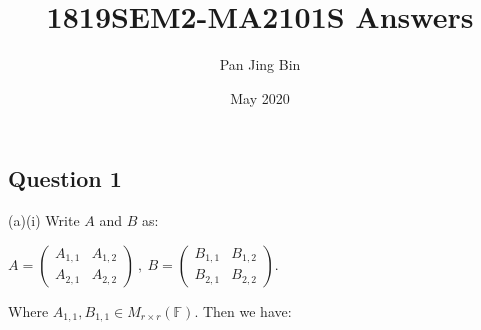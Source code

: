 \documentclass{article}
\title{1819SEM2-MA2101S Answers}
\author{Pan Jing Bin}
\date{May 2020}
\begin{document}
\maketitle

\subsection*{Question 1}(a)(i) Write $A$ and $B$ as: \begin{center}    $A = \begin{pmatrix}
A_{1,1} & A_{1,2}\\
A_{2,1} & A_{2,2}
\end{pmatrix}\ ,\ B = \begin{pmatrix}
B_{1,1} & B_{1,2}\\
B_{2,1} & B_{2,2}
\end{pmatrix}$.
\end{center}
Where $A_{1,1},B_{1,1} \in M_{r\times r}(\mathbb{F})$. Then we have:
\end{document}

